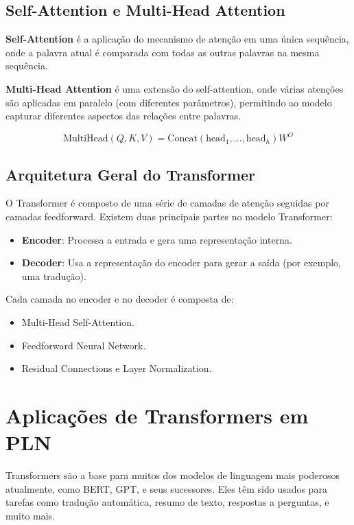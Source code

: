 \documentclass[14pt,a4paper,oneside]{book}
\begin{document}
\subsection{Self-Attention e Multi-Head Attention}

\textbf{Self-Attention} é a aplicação do mecanismo de atenção em uma única sequência, onde a palavra atual é comparada com todas as outras palavras na mesma sequência.

\textbf{Multi-Head Attention} é uma extensão do self-attention, onde várias atenções são aplicadas em paralelo (com diferentes parâmetros), permitindo ao modelo capturar diferentes aspectos das relações entre palavras.

\begin{equation}
	\text{MultiHead}(Q, K, V) = \text{Concat}(\text{head}_1, \dots, \text{head}_h)W^O
\end{equation}

\subsection{Arquitetura Geral do Transformer}

O Transformer é composto de uma série de camadas de atenção seguidas por camadas feedforward. Existem duas principais partes no modelo Transformer:

\begin{itemize}
	\item \textbf{Encoder}: Processa a entrada e gera uma representação interna.
	\item \textbf{Decoder}: Usa a representação do encoder para gerar a saída (por exemplo, uma tradução).
\end{itemize}

Cada camada no encoder e no decoder é composta de:
\begin{itemize}
	\item Multi-Head Self-Attention.
	\item Feedforward Neural Network.
	\item Residual Connections e Layer Normalization.
\end{itemize}

\section{Aplicações de Transformers em PLN}

Transformers são a base para muitos dos modelos de linguagem mais poderosos atualmente, como BERT, GPT, e seus sucessores. Eles têm sido usados para tarefas como tradução automática, resumo de texto, respostas a perguntas, e muito mais.
\end{document}
